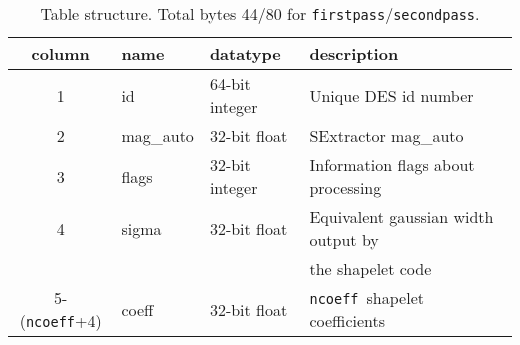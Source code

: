 \documentclass[12pt]{article}
\newcommand{\fpt}{\texttt{firstpass}}
\newcommand{\spt}{\texttt{secondpass}}
\newcommand{\ncoeff}{\texttt{ncoeff}}
\begin{document}
\begin{table}[p]
    \begin{center}
    \small
    \begin{tabular}{clll}
    column & name & datatype & description\\
    \hline
    1 & id       & 64-bit integer &  Unique DES id number \\
    2 & mag\_auto & 32-bit float   & SExtractor mag\_auto \\
    3 & flags   & 32-bit integer & Information flags about processing \\
    4 & sigma    & 32-bit float   & Equivalent gaussian width output by \\
      & & &                              the shapelet code \\
    5-(\ncoeff+4) & coeff & 32-bit float & \ncoeff\ shapelet coefficients \\
    \hline
    \end{tabular}
    \end{center}

    \caption{Table structure. Total bytes 44/80 for \fpt/\spt.
    \label{tab:psfstruct}}

    \normalsize
\end{table}
\end{document}
